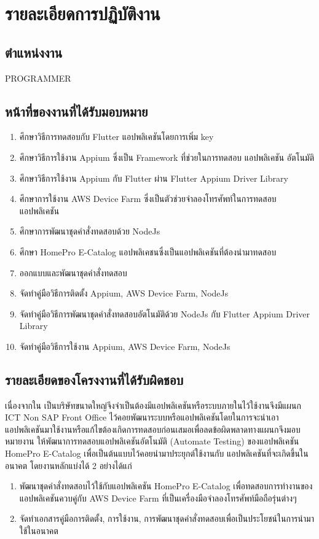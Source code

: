 \chapter{รายละเอียดการปฏิบัติงาน}
\thispagestyle{empty}
\label{chapter:coop-detail}

\section{ตำแหน่งงาน}
    PROGRAMMER

\section{หน้าที่ของงานที่ได้รับมอบหมาย}
    \begin{enumerate}
        \item ศึกษาวิธีการทดสอบกับ Flutter แอปพลิเคชันโดยการเพิ่ม key
        \item ศึกษาวิธีการใช้งาน Appium ซึ่งเป็น Framework ที่ช่วยในการทดสอบ แอปพลิเคชัน อัตโนมัติ
        \item ศึกษาวิธีการใช้งาน Appium กับ Flutter ผ่าน Flutter Appium Driver Library
        \item ศึกษาการใช้งาน AWS Device Farm ซึ่งเป็นตัวช่วยจำลองโทรศัพท์ในการทดสอบแอปพลิเคชัน
        \item ศึกษาการพัฒนาชุดคำสั่งทดสอบด้วย NodeJs
        \item ศึกษา HomePro E-Catalog แอปพลิเคชนซึ่งเป็นแอปพลิเคชันที่ต้องนำมาทดสอบ
        \item ออกแบบและพัฒนาชุดคำสั่งทดสอบ
        \item จัดทำคู่มือวิธีการติดตั้ง Appium, AWS Device Farm, NodeJs
        \item จัดทำคู่มือวิธีการพัฒนาชุดคำสั่งทดสอบอัตโนมัติด้วย NodeJs กับ Flutter Appium Driver Library
        \item จัดทำคู่มือวิธีการใช้งาน Appium, AWS Device Farm, NodeJs
    \end{enumerate}

\section{รายละเอียดของโครงงานที่ได้รับผิดชอบ}
    เนื่องจากใน {\Company} เป็นบริษัทขนาดใหญ่จึงจำเป็นต้องมีแอปพลิเคชันหรือระบบภายในไว้ใช้งานจึงมีแผนก ICT Non SAP Front Office
    ไว้คอยพัฒนาระบบหรือแอปพลิเคชันโดยในการจะนำเอาแอปพลิเคชันมาใช้งานหรือแก้ไขต้องเกิดการทดสอบก่อนเสมอเพื่อลดข้อผิดพลาดทางแผนกจึงมอบหมายงาน
    ให้พัฒนาการทดสอบแอปพลิเคชันอัตโนมัติ (Automate Testing) ของแอปพลิเคชัน HomePro E-Catalog เพื่อเป็นต้นแบบไว้คอยนำมาประยุกต์ใช้งานกับ
    แอปพลิเคชันที่จะเกิดขึ้นในอนาคต โดยงานหลักแบ่งได้ 2 อย่างได้แก่
    \begin{enumerate}
        \item พัฒนาชุดคำสั่งทดสอบไว้ใช้กับแอปพลิเคชัน HomePro E-Catalog เพื่อทดสอบการทำงานของแอปพลิเคชันควบคู่กับ AWS Device Farm ที่เป็นเครื่องมือจำลองโทรศัพท์มือถือรุ่นต่างๆ
        \item จัดทำเอกสารคู่มือการติดตั้ง, การใช้งาน, การพัฒนาชุดคำสั่งทดสอบเพื่อเป็นประโยชน์ในการนำมาใช้ในอนาคต 
    \end{enumerate}

